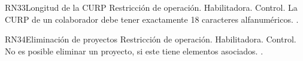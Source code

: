 \begin{BussinesRule}{RN33}{Longitud de la CURP} 
	\BRitem[Tipo:] Restricción de operación. 
	\BRitem[Clase:] Habilitadora. 
	\BRitem[Nivel:] Control. %
	\BRitem[Descripción:] La CURP de un colaborador debe tener exactamente 18 caracteres alfanuméricos.
	 \UCref{}{}. 
\end{BussinesRule}


\begin{BussinesRule}{RN34}{Eliminación de proyectos} 
	\BRitem[Tipo:] Restricción de operación. 
	\BRitem[Clase:] Habilitadora. 
	\BRitem[Nivel:] Control. %
	\BRitem[Descripción:] No es posible eliminar un proyecto, si este tiene elementos asociados.
	 \UCref{}{}. 
\end{BussinesRule}
